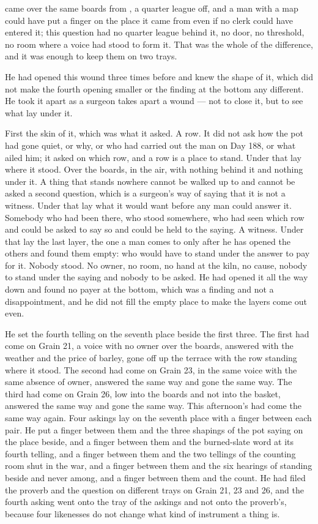 came over the same boards from , a quarter league off, and a man with a map could have put a finger on the place it came from even if no clerk could have entered it; this question had no quarter league behind it, no door, no threshold, no room where a voice had stood to form it. That was the whole of the difference, and it was enough to keep them on two trays.

He had opened this wound three times before and knew the shape of it, which did not make the fourth opening smaller or the finding at the bottom any different. He took it apart as a surgeon takes apart a wound --- not to close it, but to see what lay under it.

First the skin of it, which was what it asked. A row. It did not ask how the pot had gone quiet, or why, or who had carried out the man on Day 188, or what ailed him; it asked on which row, and a row is a place to stand. Under that lay where it stood. Over the boards, in the air, with nothing behind it and nothing under it. A thing that stands nowhere cannot be walked up to and cannot be asked a second question, which is a surgeon's way of saying that it is not a witness. Under that lay what it would want before any man could answer it. Somebody who had been there, who stood somewhere, who had seen which row and could be asked to say so and could be held to the saying. A witness. Under that lay the last layer, the one a man comes to only after he has opened the others and found them empty: who would have to stand under the answer to pay for it. Nobody stood. No owner, no room, no hand at the kiln, no cause, nobody to stand under the saying and nobody to be asked. He had opened it all the way down and found no payer at the bottom, which was a finding and not a disappointment, and he did not fill the empty place to make the layers come out even.

He set the fourth telling on the seventh place beside the first three. The first had come on Grain 21, a voice with no owner over the boards, answered with the weather and the price of barley, gone off up the terrace with the row standing where it stood. The second had come on Grain 23, in the same voice with the same absence of owner, answered the same way and gone the same way. The third had come on Grain 26, low into the boards and not into the basket, answered the same way and gone the same way. This afternoon's had come the same way again. Four askings lay on the seventh place with a finger between each pair. He put a finger between them and the three shapings of the pot saying on the place beside, and a finger between them and the burned-slate word at its fourth telling, and a finger between them and the two tellings of the counting room shut in the war, and a finger between them and the six hearings of  standing beside and never among, and a finger between them and the count. He had filed the proverb and the question on different trays on Grain 21, 23 and 26, and the fourth asking went onto the tray of the askings and not onto the proverb's, because four likenesses do not change what kind of instrument a thing is.

